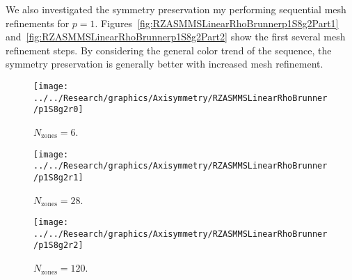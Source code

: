 \documentclass[12pt]{article}
\begin{document}
We also investigated the symmetry preservation my performing sequential mesh refinements for $p=1$. Figures~\ref{fig:RZASMMSLinearRhoBrunnerp1S8g2Part1} and~\ref{fig:RZASMMSLinearRhoBrunnerp1S8g2Part2} show the first several mesh refinement steps. By considering the general color trend of the sequence, the symmetry preservation is generally better with increased mesh refinement.

\begin{sidewaysfigure}[!htb]
\centering
\begin{subfigure}{0.33\textwidth}
\texttt{[image: ../../Research/graphics/Axisymmetry/RZASMMSLinearRhoBrunner/p1S8g2r0]}
\caption{$N_\text{zones}=6$.}
\end{subfigure}%
\begin{subfigure}{0.33\textwidth}
\texttt{[image: ../../Research/graphics/Axisymmetry/RZASMMSLinearRhoBrunner/p1S8g2r1]}
\caption{$N_\text{zones}=28$.}
\end{subfigure}%
\begin{subfigure}{0.33\textwidth}
\texttt{[image: ../../Research/graphics/Axisymmetry/RZASMMSLinearRhoBrunner/p1S8g2r2]}
\caption{$N_\text{zones}=120$.}
\end{subfigure}
\caption{Relative asymmetry for $p=1$ finite elements on a $2^\text{nd}$-order mesh for $S_8$ level-symmetric angular quadrature.}
\label{fig:RZASMMSLinearRhoBrunnerp1S8g2Part1}
\end{sidewaysfigure}
\end{document}

